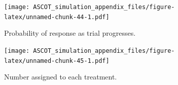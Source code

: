 \documentclass[
]{article}
\begin{document}
\begin{figure}
\centering
\texttt{[image: ASCOT\_simulation\_appendix\_files/figure-latex/unnamed-chunk-44-1.pdf]}
\caption{\label{fig:unnamed-chunk-44}Probability of response as trial progresses.}
\end{figure}

\begin{figure}
\centering
\texttt{[image: ASCOT\_simulation\_appendix\_files/figure-latex/unnamed-chunk-45-1.pdf]}
\caption{\label{fig:unnamed-chunk-45}Number assigned to each treatment.}
\end{figure}

\clearpage
\end{document}
